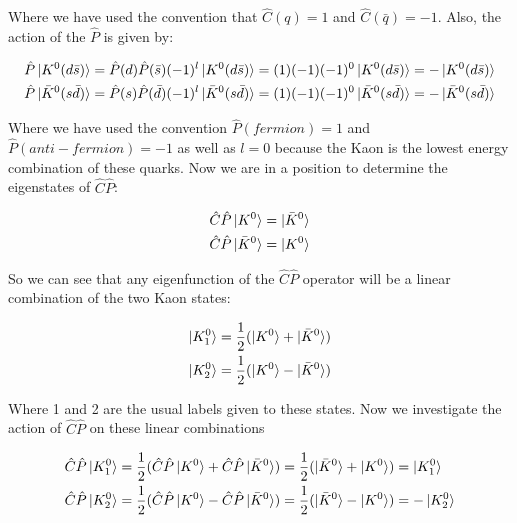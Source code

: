 \noindent Where we have used the convention that $\hat{C} (q) = 1$ and $\hat{C} (\bar{q}) = -1$. Also, the action of the $\hat{P}$ is given by:
    
\begin{align*}
\hat{P} \ket{K^{0}(d \bar{s})} = \hat{P}(d) \hat{P}(\bar{s})(-1)^{l} \ket{K^{0}(d \bar{s})} = (1)(-1)(-1)^0 \ket{K^{0}(d \bar{s})} = - \ket{K^{0}(d \bar{s})} \\
\hat{P} \ket{\bar{K}^{0}(s \bar{d})} = \hat{P}(s) \hat{P}(\bar{d})(-1)^{l} \ket{\bar{K}^{0}(s \bar{d})} = (1)(-1)(-1)^0 \ket{\bar{K}^{0}(s \bar{d})} = - \ket{\bar{K}^{0}(s \bar{d})} 
\end{align*}

\smallskip

\noindent Where we have used the convention $\hat{P} (fermion) = 1$ and $\hat{P} (anti-fermion) = -1$ as well as $l=0$ because the Kaon is the lowest energy combination of these quarks. Now we are in a position to determine the eigenstates of $\hat{C}\hat{P}$:

\begin{align*}
\hat{C}\hat{P} \ket{K^{0}} = \ket{\bar{K}^{0}} \\
\hat{C}\hat{P} \ket{\bar{K}^{0}} = \ket{K^{0}} 
\end{align*}

\noindent So we can see that any eigenfunction of the $\hat{C}\hat{P}$ operator will be a linear combination of the two Kaon states:

\begin{align*}
\ket{K^{0}_{1}} = \frac{1}{2} (\ket{K^{0}} + \ket{\bar{K}^{0}}) \\
\ket{K^{0}_{2}} = \frac{1}{2} (\ket{K^{0}} - \ket{\bar{K}^{0}})
\end{align*} 

\noindent Where 1 and 2 are the usual labels given to these states. Now we investigate the action of $\hat{C}\hat{P}$ on these linear combinations

\smallskip

\begin{align*}
\hat{C}\hat{P} \ket{K^{0}_{1}} & = \frac{1}{2} (\hat{C}\hat{P} \ket{K^{0}} + \hat{C}\hat{P} \ket{\bar{K}^{0}}) = \frac{1}{2} (\ket{\bar{K}^{0}} + \ket{K^{0}}) = \ket{K^{0}_{1}} \\
\hat{C}\hat{P} \ket{K^{0}_{2}} & = \frac{1}{2} (\hat{C}\hat{P} \ket{K^{0}} - \hat{C}\hat{P} \ket{\bar{K}^{0}}) =   \frac{1}{2} (\ket{\bar{K}^{0}} - \ket{K^{0}}) = - \ket{K^{0}_{2}} \\
\end{align*} 

